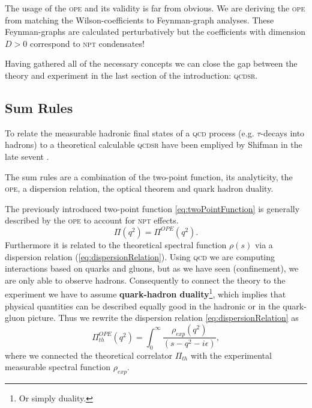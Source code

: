 \documentclass[../../index.tex]{subfiles}
\begin{document}
The usage of the \textsc{ope} and its validity is far from obvious. We are deriving the
\textsc{ope} from matching the Wilson-coefficients to Feynman-graph analyses. These
Feynman-graphs are calculated perturbatively but the coefficients with dimension
$D>0$ correspond to \textsc{npt} condensates!

Having gathered all of the necessary concepts we can close the gap between the
theory and experiment in the last section of the introduction: \textsc{qcdsr}.


\subsection{Sum Rules}
\label{sec:sumRules}
To relate the measurable hadronic final states of a \textsc{qcd} process (e.g.
$\tau$-decays into hadrons) to a theoretical calculable \textsc{qcdsr} have been
empliyed by Shifman in the late sevent \cite{Shifman1978}.

The sum rules are a combination of the two-point function, its analyticity, the
\textsc{ope}, a dispersion relation, the optical theorem and quark hadron
duality.

The previously introduced two-point function \cref{eq:twoPointFunction} is
generally described by the \textsc{ope} to account for \textsc{npt} effects.
\begin{equation}
  \Pi(q^2) = \Pi^{OPE}(q^2).
\end{equation}
Furthermore it is related to the theoretical spectral function $\rho(s)$ via a
dispersion relation (\cref{eq:dispersionRelation}). Using \textsc{qcd} we are
computing interactions based on quarks and gluons, but as we have seen
(confinement), we are only able to observe hadrons. Consequently to connect the
theory to the experiment we have to assume \textbf{quark-hadron
  duality}\footnote{Or simply duality.}, which implies that physical quantities
can be described equally good in the hadronic or in the quark-gluon picture.
Thus we rewrite the dispersion relation \cref{eq:dispersionRelation} as
\begin{equation}
  \Pi^{OPE}_{th}(q^2) = \int_0^\infty \frac{\rho_{exp}(q^2)}{(s-q^2-i\epsilon)},
\end{equation}
where we connected the theoretical correlator $\Pi_{th}$ with the experimental
measurable spectral function $\rho_{exp}$.
\end{document}
